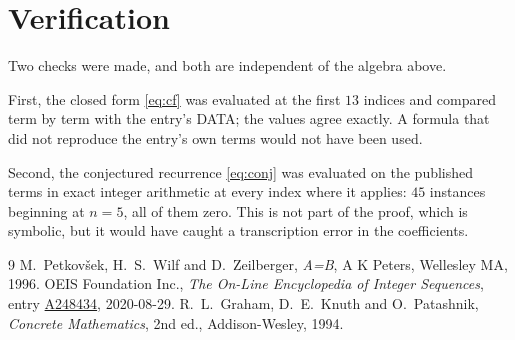 \documentclass[11pt,a4paper]{article}
\theoremstyle{plain}
\theoremstyle{definition}
\begin{document}
\section{Verification}

Two checks were made, and both are independent of the algebra above.

First, the closed form \eqref{eq:cf} was evaluated at the first $13$ indices and
compared term by term with the entry's DATA; the values agree exactly. A formula that did
not reproduce the entry's own terms would not have been used.

Second, the conjectured recurrence \eqref{eq:conj} was evaluated on the published terms in
exact integer arithmetic at every index where it applies: $45$ instances beginning at
$n=5$, all of them zero. This is not part of the proof, which is symbolic, but it
would have caught a transcription error in the coefficients.

\begin{thebibliography}{9}
 M.~Petkov\v{s}ek, H.~S.~Wilf and D.~Zeilberger, \emph{A=B}, A K Peters,
Wellesley MA, 1996.
 OEIS Foundation Inc., \emph{The On-Line Encyclopedia of Integer Sequences},
entry \href{https://oeis.org/A248434}{A248434}, 2020-08-29.
 R.~L.~Graham, D.~E.~Knuth and O.~Patashnik, \emph{Concrete Mathematics},
2nd ed., Addison-Wesley, 1994.
\end{thebibliography}
\end{document}
